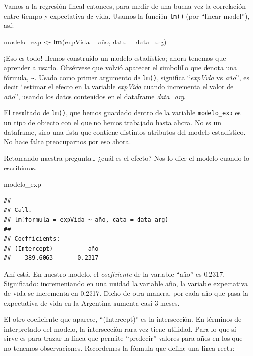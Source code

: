 \documentclass[]{book}
\newenvironment{Shaded}{\begin{snugshade}}{\end{snugshade}}
\newcommand{\KeywordTok}[1]{\textcolor[rgb]{0.13,0.29,0.53}{\textbf{#1}}}
\newcommand{\DataTypeTok}[1]{\textcolor[rgb]{0.13,0.29,0.53}{#1}}
\newcommand{\StringTok}[1]{\textcolor[rgb]{0.31,0.60,0.02}{#1}}
\newcommand{\OperatorTok}[1]{\textcolor[rgb]{0.81,0.36,0.00}{\textbf{#1}}}
\newcommand{\NormalTok}[1]{#1}
\begin{document}
Vamos a la regresión lineal entonces, para medir de una buena vez la
correlación entre tiempo y expectativa de vida. Usamos la función
\texttt{lm()} (por ``linear model''), así:

\begin{Shaded}
\begin{Highlighting}[]
\NormalTok{modelo_exp <-}\StringTok{ }\KeywordTok{lm}\NormalTok{(expVida }\OperatorTok{~}\StringTok{ }\NormalTok{año, }\DataTypeTok{data =}\NormalTok{ data_arg)}
\end{Highlighting}
\end{Shaded}

¡Eso es todo! Hemos construido un modelo estadístico; ahora tenemos que
aprender a usarlo. Obsérvese que volvió aparecer el simbolillo que
denota una fórmula, \texttt{\textasciitilde{}}. Usado como primer
argumento de \texttt{lm()}, significa ``\emph{expVida} vs \emph{año}'',
es decir ``estimar el efecto en la variable \emph{expVida} cuando
incrementa el valor de \emph{año}'', usando los datos contenidos en el
dataframe \emph{data\_arg}.

El resultado de \texttt{lm()}, que hemos guardado dentro de la variable
\texttt{modelo\_exp} es un tipo de objecto con el que no hemos trabajado
hasta ahora. No es un dataframe, sino una lista que contiene distintos
atributos del modelo estadístico. No hace falta preocuparnos por eso
ahora.

Retomando nuestra pregunta\ldots{} ¿cuál es el efecto? Nos lo dice el
modelo cuando lo escribimos.

\begin{Shaded}
\begin{Highlighting}[]
\NormalTok{modelo_exp}
\end{Highlighting}
\end{Shaded}

\begin{verbatim}
## 
## Call:
## lm(formula = expVida ~ año, data = data_arg)
## 
## Coefficients:
## (Intercept)          año  
##   -389.6063       0.2317
\end{verbatim}

Ahí está. En nuestro modelo, el \emph{coeficiente} de la variable
``año'' es 0.2317. Significado: incrementando en una unidad la variable
año, la variable expectativa de vida se incrementa en 0.2317. Dicho de
otra manera, por cada año que pasa la expectativa de vida en la
Argentina aumenta casi 3 meses.

El otro coeficiente que aparece, ``(Intercept)'' es la intersección. En
términos de interpretado del modelo, la intersección rara vez tiene
utilidad. Para lo que sí sirve es para trazar la línea que permite
``predecir'' valores para años en los que no tenemos observaciones.
Recordemos la fórmula que define una línea recta:
\end{document}
